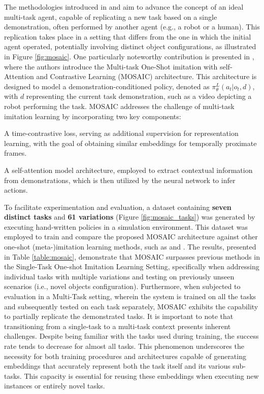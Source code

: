 \newline The methodologies introduced in \cite{bhutani2022attentive_one_shot} and \cite{mandi2022towards_more_generalizable_one_shot} aim to advance the concept of an ideal multi-task agent, capable of replicating a new task based on a single demonstration, often performed by another agent (e.g., a robot or a human). This replication takes place in a setting that differs from the one in which the initial agent operated, potentially involving distinct object configurations, as illustrated in Figure \ref{fig:mosaic}. One particularly noteworthy contribution is presented in \cite{mandi2022towards_more_generalizable_one_shot}, where the authors introduce the Multi-task One-Shot imitation with self-Attention and Contrastive Learning (MOSAIC) architecture. This architecture is designed to model a demonstration-conditioned policy, denoted as $\pi^{L}_{\theta}(a_{t}|o_{t},d)$, with $d$ representing the current task demonstration, such as a video depicting a robot performing the task. MOSAIC addresses the challenge of multi-task imitation learning by incorporating two key components:
\begin{enumerate*}[label=\textbf{(\arabic*)}]
    \item A time-contrastive loss, serving as additional supervision for representation learning, with the goal of obtaining similar embeddings for temporally proximate frames.
    \item A self-attention model architecture, employed to extract contextual information from demonstrations, which is then utilized by the neural network to infer actions.
\end{enumerate*}
To facilitate experimentation and evaluation, a dataset containing \textbf{seven distinct tasks} and \textbf{61 variations} (Figure \ref{fig:mosaic_tasks}) was generated by executing hand-written policies in a simulation environment. This dataset was employed to train and compare the proposed MOSAIC architecture against other one-shot (meta-)imitation learning methods, such as \cite{yu2018daml} and \cite{dasari2021transformers_one_shot}. The results, presented in Table \ref{table:mosaic}, demonstrate that MOSAIC surpasses previous methods in the Single-Task One-shot Imitation Learning Setting, specifically when addressing individual tasks with multiple variations and testing on previously unseen scenarios (i.e., novel objects configuration).
Furthermore, when subjected to evaluation in a Multi-Task setting, wherein the system is trained on all the tasks and subsequently tested on each task separately, MOSAIC exhibits the capability to partially replicate the demonstrated tasks. It is important to note that transitioning from a single-task to a multi-task context presents inherent challenges. Despite being familiar with the tasks used during training, the success rate tends to decrease for almost all tasks. This phenomenon underscores the necessity for both training procedures and architectures capable of generating embeddings that accurately represent both the task itself and its various sub-tasks. This capacity is essential for reusing these embeddings when executing new instances or entirely novel tasks.
